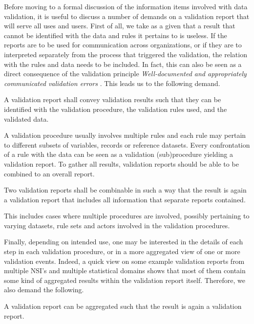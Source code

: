 Before moving to a formal discussion of the information items involved with
data validation, it is useful to discuss a number of demands on a validation
report that will serve all uses and users. First of all, we take as a given
that a result that cannot be identified with the data and rules it pertains to
is useless. If the reports are to be used for communication across
organizations, or if they are to interpreted separately from the process that
triggered the validation, the relation with the rules and data needs to be
included.  In fact, this can also be seen as a direct consequence of the
validation principle \emph{Well-documented and appropriately communicated
validation errors} \citep{ess2017}. This leads us to the following demand.

\begin{demand}[Identification]
A validation report shall convey validation results such that they can be
identified with the validation procedure, the validation rules used, and the
validated data.
\label{dem:identify}
\end{demand}


A validation procedure usually involves multiple rules and each rule may
pertain to different subsets of variables, records or reference datasets. Every
confrontation of a rule with the data can be seen as a validation
(sub)procedure yielding a validation report. To gather all results, validation
reports should be able to be combined to an overall report.
%
\begin{demand}
Two validation reports shall be combinable in such a way that the result is
again a validation report that includes all information that separate reports
contained.
\label{dem:combine}
\end{demand}
%
This includes cases where multiple procedures are involved, possibly pertaining
to varying datasets, rule sets and actors involved in the validation procedures. 

Finally, depending on intended use, one may be interested in the details of
each step in each validation procedure, or in a more aggregated view of one or
more validation events. Indeed, a quick view on some example validation reports
from multiple NSI's and multiple statistical domains shows that most of them
contain some kind of aggregated results within the validation report itself.
Therefore, we also demand the following.

\begin{demand}
A validation report can be aggregated such that the result is again a
validation report.
\label{dem:aggregate}
\end{demand}

